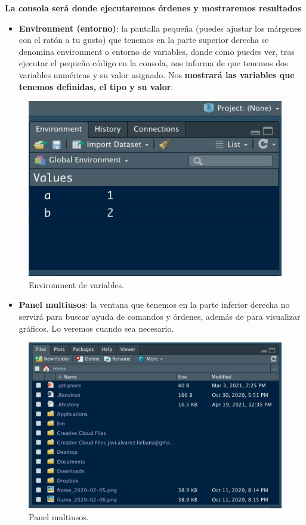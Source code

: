 \documentclass[11pt,]{book}
\providecommand{\tightlist}{%
  \setlength{\itemsep}{0pt}\setlength{\parskip}{0pt}}
\begin{document}
\textbf{La consola será donde ejecutaremos órdenes y mostraremos resultados}

\begin{itemize}
\tightlist
\item
  \textbf{Environment (entorno)}: la pantalla pequeña (puedes ajustar los márgenes con el ratón a tu gusto) que tenemos en la parte superior derecha se denomina environment o entorno de variables, donde como puedes ver, tras ejecutar el pequeño código en la consola, nos informa de que tenemos dos variables numéricas y su valor asignado. Nos \textbf{mostrará las variables que tenemos definidas, el tipo y su valor}.
\end{itemize}

\begin{figure}

{\centering \includegraphics[width=0.75\linewidth]{./img/inicio_rstudio_3} 

}

\caption{Environment de variables.}\label{fig:inicio-rstudio-3}
\end{figure}

\begin{itemize}
\tightlist
\item
  \textbf{Panel multiusos}: la ventana que tenemos en la parte inferior derecha no servirá para buscar ayuda de comandos y órdenes, además de para visualizar gráficos. Lo veremos cuando sea necesario.
\end{itemize}

\begin{figure}

{\centering \includegraphics[width=0.75\linewidth]{./img/inicio_rstudio_4} 

}

\caption{Panel multiusos.}\label{fig:inicio-rstudio-4}
\end{figure}
\end{document}
